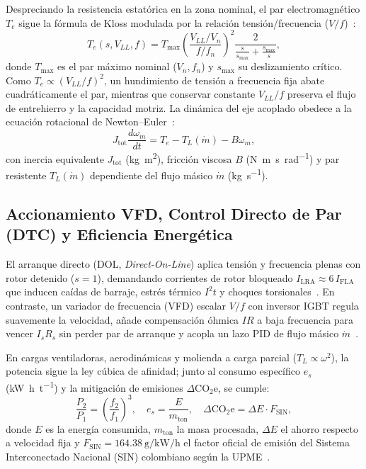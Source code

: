 Despreciando la resistencia estatórica en la zona nominal, el par electromagnético $T_e$ sigue la fórmula de Kloss modulada por la relación tensión/frecuencia ($V/f$)~\cite{Chapman2012,Krishnan2001}:
\begin{equation}
T_e(s, V_{LL}, f) = T_{\max}\left(\frac{V_{LL}/V_n}{f/f_n}\right)^{\!2}
\frac{2}{\frac{s}{s_{\max}} + \frac{s_{\max}}{s}},
\label{eq:kloss_vf}
\end{equation}
donde $T_{\max}$ es el par máximo nominal ($V_n, f_n$) y $s_{\max}$ su deslizamiento crítico. Como $T_e \propto (V_{LL}/f)^2$, un hundimiento de tensión a frecuencia fija abate cuadráticamente el par, mientras que conservar constante $V_{LL}/f$ preserva el flujo de entrehierro y la capacidad motriz. La dinámica del eje acoplado obedece a la ecuación rotacional de Newton--Euler~\cite{Krishnan2001}:
\begin{equation}
J_{\text{tot}}\frac{d\omega_m}{dt} = T_e - T_L(\dot{m}) - B\omega_m,
\label{eq:newton_euler}
\end{equation}
con inercia equivalente $J_{\text{tot}}$ (\unit{\kilogram\meter\squared}), fricción viscosa $B$ (\unit{\newton\meter\second\per\radian}) y par resistente $T_L(\dot{m})$ dependiente del flujo másico $\dot{m}$ (\unit{\kilogram\per\second}).

\subsection{Accionamiento VFD, Control Directo de Par (DTC) y Eficiencia Energética}\label{subsec:vfd_dtc}

El arranque directo (DOL, \emph{Direct-On-Line}) aplica tensión y frecuencia plenas con rotor detenido ($s=1$), demandando corrientes de rotor bloqueado $I_{\text{LRA}} \approx \num{6}\,I_{\text{FLA}}$ que inducen caídas de barraje, estrés térmico $I^2 t$ y choques torsionales~\cite{Bose2006}. En contraste, un variador de frecuencia (VFD) escalar $V/f$ con inversor IGBT regula suavemente la velocidad, añade compensación óhmica $IR$ a baja frecuencia para vencer $I_s R_s$ sin perder par de arranque y acopla un lazo PID de flujo másico $\dot{m}$~\cite{Bose2006}.

En cargas ventiladoras, aerodinámicas y molienda a carga parcial ($T_L \propto \omega^2$), la potencia sigue la ley cúbica de afinidad; junto al consumo específico $e_s$ (\unit{\kilo\watt\hour\per\tonne}) y la mitigación de emisiones $\Delta\text{CO}_2\text{e}$, se cumple:
\begin{equation}
\frac{P_2}{P_1} = \left(\frac{f_2}{f_1}\right)^{\!3}, \quad
e_s = \frac{E}{m_{\text{ton}}}, \quad
\Delta\text{CO}_2\text{e} = \Delta E \cdot F_{\text{SIN}},
\label{eq:afinidad_upme}
\end{equation}
donde $E$ es la energía consumida, $m_{\text{ton}}$ la masa procesada, $\Delta E$ el ahorro respecto a velocidad fija y $F_{\text{SIN}} = \qty{164.38}{\gram\per\kilo\watt\per\hour}$ el factor oficial de emisión del Sistema Interconectado Nacional (SIN) colombiano según la UPME~\cite{UPME2024}.


